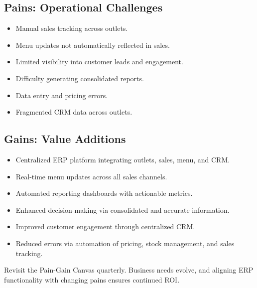 \subsection*{Pains: Operational Challenges}
\begin{itemize}
    \item Manual sales tracking across outlets.
    \item Menu updates not automatically reflected in sales.
    \item Limited visibility into customer leads and engagement.
    \item Difficulty generating consolidated reports.
    \item Data entry and pricing errors.
    \item Fragmented CRM data across outlets.
\end{itemize}

\subsection*{Gains: Value Additions}
\begin{itemize}
    \item Centralized ERP platform integrating outlets, sales, menu, and CRM.
    \item Real-time menu updates across all sales channels.
    \item Automated reporting dashboards with actionable metrics.
    \item Enhanced decision-making via consolidated and accurate information.
    \item Improved customer engagement through centralized CRM.
    \item Reduced errors via automation of pricing, stock management, and sales tracking.
\end{itemize}

\begin{tcolorbox}[colback=white,colframe=odooPurple,title=Tip, fonttitle=\bfseries, coltitle=white]
Revisit the Pain-Gain Canvas quarterly. 
Business needs evolve, and aligning ERP functionality with changing pains ensures continued ROI.
\end{tcolorbox}

